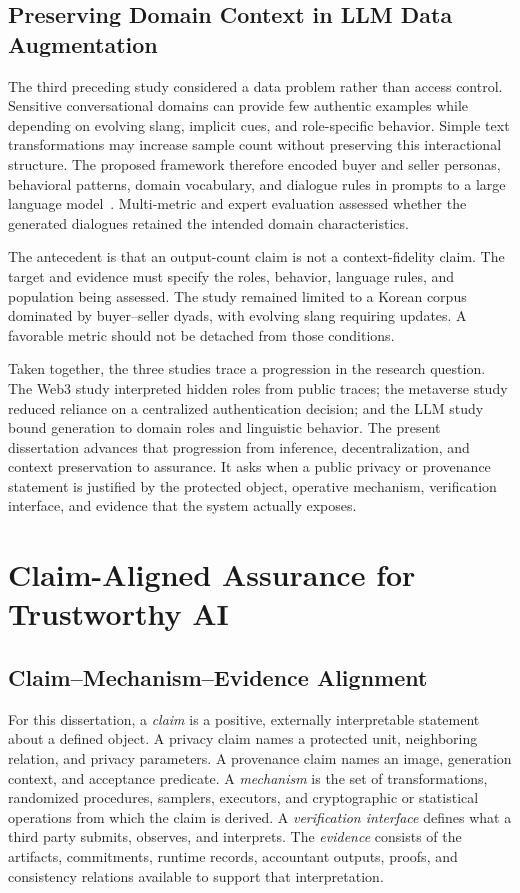 \subsection{Preserving Domain Context in LLM Data Augmentation}
\label{subsec:ch1-trajectory-llm}

The third preceding study considered a data problem rather than access control.
Sensitive conversational domains can provide few authentic examples while
depending on evolving slang, implicit cues, and role-specific behavior.  Simple
text transformations may increase sample count without preserving this
interactional structure.  The proposed framework therefore encoded buyer and
seller personas, behavioral patterns, domain vocabulary, and dialogue rules in
prompts to a large language model~\cite{jeong2025persona}.  Multi-metric and expert
evaluation assessed whether the generated dialogues retained the intended domain
characteristics.

The antecedent is that an output-count claim is not a context-fidelity claim.  The
target and evidence must specify the roles, behavior, language rules, and
population being assessed.  The study remained limited to a Korean corpus
dominated by buyer--seller dyads, with evolving slang requiring updates.  A
favorable metric should not be detached from those conditions.

Taken together, the three studies trace a progression in the research question.
The Web3 study interpreted hidden roles from public traces; the metaverse study
reduced reliance on a centralized authentication decision; and the LLM study
bound generation to domain roles and linguistic behavior.  The present
dissertation advances that progression from inference, decentralization, and
context preservation to assurance.  It asks when a public privacy or provenance
statement is justified by the protected object, operative mechanism, verification
interface, and evidence that the system actually exposes.


\section{Claim-Aligned Assurance for Trustworthy AI}
\label{sec:ch1-caa}

\subsection{Claim--Mechanism--Evidence Alignment}
\label{subsec:ch1-alignment}

For this dissertation, a \emph{claim} is a positive, externally interpretable
statement about a defined object.  A privacy claim names a protected unit,
neighboring relation, and privacy parameters.  A provenance claim names an image,
generation context, and acceptance predicate.  A \emph{mechanism} is the set of
transformations, randomized procedures, samplers, executors, and cryptographic or
statistical operations from which the claim is derived.  A \emph{verification
interface} defines what a third party submits, observes, and interprets.  The
\emph{evidence} consists of the artifacts, commitments, runtime records,
accountant outputs, proofs, and consistency relations available to support that
interpretation.

